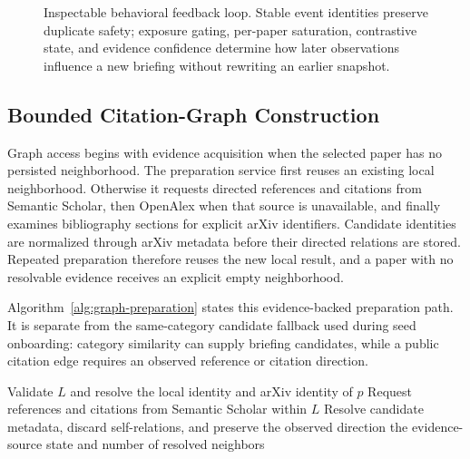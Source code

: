 \begin{figure}[htbp]
  \caption{Inspectable behavioral feedback loop. Stable event identities preserve duplicate safety; exposure gating, per-paper saturation, contrastive state, and evidence confidence determine how later observations influence a new briefing without rewriting an earlier snapshot.}
  \label{fig:behavior-loop}
\end{figure}

\subsection{Bounded Citation-Graph Construction}
\label{subsec:backend-graph}

Graph access begins with evidence acquisition when the selected paper has no
persisted neighborhood. The preparation service first reuses an existing local
neighborhood. Otherwise it requests directed references and citations from
Semantic Scholar, then OpenAlex when that source is unavailable, and finally
examines bibliography sections for explicit arXiv identifiers. Candidate
identities are normalized through arXiv metadata before their directed relations
are stored. Repeated preparation therefore reuses the new local result, and a
paper with no resolvable evidence receives an explicit empty neighborhood.

Algorithm~\ref{alg:graph-preparation} states this evidence-backed preparation
path. It is separate from the same-category candidate fallback used during seed
onboarding: category similarity can supply briefing candidates, while a public
citation edge requires an observed reference or citation direction.

\begin{algorithm}[htbp]
  \caption{Evidence-backed on-demand citation-graph preparation}
  \label{alg:graph-preparation}
  Validate \(L\) and resolve the local identity and arXiv identity of \(p\)\;
  Request references and citations from Semantic Scholar within \(L\)\;
  Resolve candidate metadata, discard self-relations, and preserve the observed direction\;
  \Return the evidence-source state and number of resolved neighbors\;
\end{algorithm}

